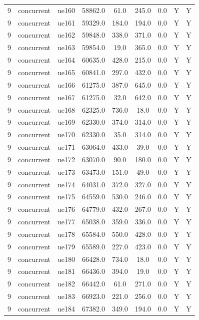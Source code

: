 \begin{table}[ht]
\begin{tabular}{|c|c|c|c|c|c|c|c|c|}
9 & concurrent & ue160 & 58862.0 & 61.0 & 245.0 & 0.0 & Y & Y \\
9 & concurrent & ue161 & 59329.0 & 184.0 & 194.0 & 0.0 & Y & Y \\
9 & concurrent & ue162 & 59848.0 & 338.0 & 371.0 & 0.0 & Y & Y \\
9 & concurrent & ue163 & 59854.0 & 19.0 & 365.0 & 0.0 & Y & Y \\
9 & concurrent & ue164 & 60635.0 & 428.0 & 215.0 & 0.0 & Y & Y \\
9 & concurrent & ue165 & 60841.0 & 297.0 & 432.0 & 0.0 & Y & Y \\
9 & concurrent & ue166 & 61275.0 & 387.0 & 645.0 & 0.0 & Y & Y \\
9 & concurrent & ue167 & 61275.0 & 32.0 & 642.0 & 0.0 & Y & Y \\
9 & concurrent & ue168 & 62325.0 & 736.0 & 18.0 & 0.0 & Y & Y \\
9 & concurrent & ue169 & 62330.0 & 374.0 & 314.0 & 0.0 & Y & Y \\
9 & concurrent & ue170 & 62330.0 & 35.0 & 314.0 & 0.0 & Y & Y \\
9 & concurrent & ue171 & 63064.0 & 433.0 & 39.0 & 0.0 & Y & Y \\
9 & concurrent & ue172 & 63070.0 & 90.0 & 180.0 & 0.0 & Y & Y \\
9 & concurrent & ue173 & 63473.0 & 151.0 & 49.0 & 0.0 & Y & Y \\
9 & concurrent & ue174 & 64031.0 & 372.0 & 327.0 & 0.0 & Y & Y \\
9 & concurrent & ue175 & 64559.0 & 530.0 & 246.0 & 0.0 & Y & Y \\
9 & concurrent & ue176 & 64779.0 & 432.0 & 267.0 & 0.0 & Y & Y \\
9 & concurrent & ue177 & 65038.0 & 359.0 & 336.0 & 0.0 & Y & Y \\
9 & concurrent & ue178 & 65584.0 & 550.0 & 428.0 & 0.0 & Y & Y \\
9 & concurrent & ue179 & 65589.0 & 227.0 & 423.0 & 0.0 & Y & Y \\
9 & concurrent & ue180 & 66428.0 & 734.0 & 18.0 & 0.0 & Y & Y \\
9 & concurrent & ue181 & 66436.0 & 394.0 & 19.0 & 0.0 & Y & Y \\
9 & concurrent & ue182 & 66442.0 & 61.0 & 271.0 & 0.0 & Y & Y \\
9 & concurrent & ue183 & 66923.0 & 221.0 & 256.0 & 0.0 & Y & Y \\
9 & concurrent & ue184 & 67382.0 & 349.0 & 194.0 & 0.0 & Y & Y \\

\end{tabular}
\end{table}
